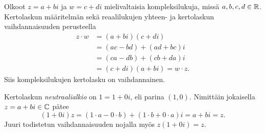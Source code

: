 \documentclass[11pt,a4paper]{amsart}
\begin{document}
\begin{solution}
Olkoot \(z = a + bi\) ja \(w = c + di\) mielivaltaisia kompleksilukuja,
missä \(a, b, c, d \in \mathbb{R}\). Kertolaskun määritelmän sekä reaalilukujen
yhteen- ja kertolaskun vaihdannaisuuden perusteella
\[
\begin{aligned}
z \cdot w &= (a + bi)(c + di) \\
&= (ac - bd) + (ad + bc)i \\
&= (ca - db) + (cb + da)i \\
&= (c + di)(a + bi) = w \cdot z.
\end{aligned}
\]
Siis kompleksilukujen kertolasku on vaihdannainen.

Kertolaskun \emph{neutraalialkio} on \(1 = 1 + 0i\), eli parina
\((1, 0)\). Nimittäin jokaisella \(z = a + bi \in \mathbb{C}\) pätee
\[
(1 + 0i)z = (1 \cdot a - 0 \cdot b) + (1 \cdot b + 0 \cdot a)i
= a + bi = z.
\]
Juuri todistetun vaihdannaisuuden nojalla myös \(z(1 + 0i) = z\).
\end{solution}
\end{document}
